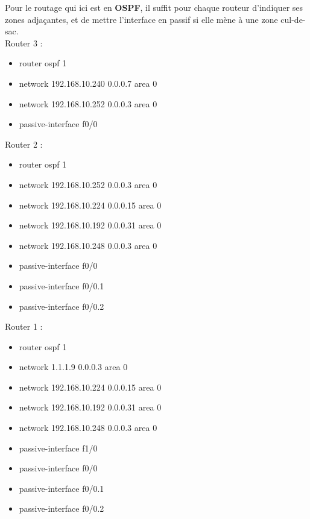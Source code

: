 \documentclass[a4paper,10pt,final,fleqn]{article}
\begin{document}
	Pour le routage qui ici est en \textbf{OSPF}, il suffit pour chaque routeur d'indiquer ses zones adjaçantes, et de mettre l'interface en passif si elle mène à une zone cul-de-sac.\\

	Router 3 : \\

	\begin{itemize}
		\item router ospf 1 
		\item network 192.168.10.240 0.0.0.7 area 0
		\item network 192.168.10.252 0.0.0.3 area 0 
		\item passive-interface f0/0\\
	\end{itemize}

	Router 2 : \\

	\begin{itemize}
		\item router ospf 1
		\item network 192.168.10.252 0.0.0.3 area 0
		\item network 192.168.10.224 0.0.0.15 area 0
		\item network 192.168.10.192 0.0.0.31 area 0
		\item network 192.168.10.248 0.0.0.3 area 0
		\item passive-interface f0/0
		\item passive-interface f0/0.1
		\item passive-interface f0/0.2\\
	\end{itemize}

	Router 1 : \\

	\begin{itemize}
		\item router ospf 1
		\item network 1.1.1.9 0.0.0.3 area 0
		\item network 192.168.10.224 0.0.0.15 area 0
		\item network 192.168.10.192 0.0.0.31 area 0
		\item network 192.168.10.248 0.0.0.3 area 0
		\item passive-interface f1/0
		\item passive-interface f0/0
		\item passive-interface f0/0.1
		\item passive-interface f0/0.2\\
	\end{itemize}
\end{document}
